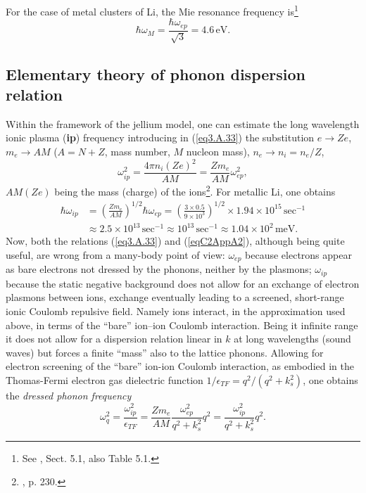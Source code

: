 For the case of metal clusters of Li, the Mie resonance frequency is\footnote{See \cite{Bertsch:05}, Sect. 5.1, also Table 5.1.}
\begin{equation}
\hbar\omega_M=\frac{\hbar\omega_{ep}}{\sqrt{3}}=4.6\,\text{eV}.
\end{equation}
\subsection{Elementary theory of phonon dispersion relation}\label{App3A3}
Within the framework of the jellium model, one can estimate the long wavelength ionic plasma (\textbf{ip}) frequency introducing in (\ref{eq3.A.33})  the substitution $e\rightarrow Ze$, $m_e\rightarrow AM$ ($A=N+Z$, mass number, $M$ nucleon mass), $n_e\rightarrow n_i=n_e/Z$,
\begin{equation}\label{eqC2AppA2}
\omega_{ip}^2=\frac{4\pi n_i(Ze)^2}{AM}=\frac{Zm_e}{AM}\omega_{ep}^2,
\end{equation}
$AM (Ze)$ being the mass (charge) of the ions\footnote{\cite{Ketterson:99}, p. 230.}.
For metallic Li, one obtains
\begin{align}
\nonumber\hbar\omega_{ip}&=\left(\frac{Zm_e}{AM}\right)^{1/2}\hbar\omega_{ep}=\left(\frac{3\times0.5}{9\times10^3}\right)^{1/2}\times1.94\times 10^{15}\,\text{sec}^{-1}\\
&\approx2.5\times10^{13}\,\text{sec}^{-1}\approx10^{13}\,\text{sec}^{-1}\approx1.04\times10^2\,\text{meV}.
\end{align}
Now, both  the  relations (\ref{eq3.A.33}) and (\ref{eqC2AppA2}), although being quite useful, are wrong from a many-body point of view: $\omega_{ep}$ because electrons appear as bare electrons not dressed by the phonons, neither by the plasmons; $\omega_{ip}$ because the  static negative background does not allow for an exchange of electron plasmons between ions, exchange eventually leading to a screened, short-range ionic Coulomb repulsive field. Namely ions interact, in the approximation used above, in terms of the ``bare'' ion--ion Coulomb interaction. Being it infinite range it does not allow for a dispersion relation linear in $k$ at long wavelengths (sound waves) but forces a finite ``mass'' also to the lattice phonons. Allowing for electron screening of the ``bare'' ion-ion Coulomb interaction, as embodied in the Thomas-Fermi electron gas dielectric function $1/\epsilon_{TF}=q^2/(q^2+k_s^2)$, one obtains the \textit{dressed phonon frequency}
\begin{equation}\label{eqC2AppA3}
\omega_q^2=\frac{\omega_{ip}^2}{\epsilon_{TF}}=\frac{Zm_e}{AM}\frac{\omega_{ep}^2}{q^2+k_s^2}q^2=\frac{\omega_{ip}^2}{q^2+k_s^2}q^2.
\end{equation}
